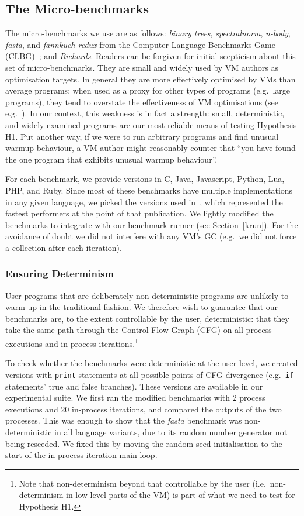 \documentclass[preprint,numbers,10pt]{sigplanconf}
\newcommand{\binarytrees}{\emph{binary trees}\xspace}
\newcommand{\richards}{\emph{Richards}\xspace}
\newcommand{\spectralnorm}{\emph{spectralnorm}\xspace}
\newcommand{\nbody}{\emph{n-body}\xspace}
\newcommand{\fasta}{\emph{fasta}\xspace}
\newcommand{\fannkuch}{\emph{fannkuch redux}\xspace}
\begin{document}
\subsection{The Micro-benchmarks}

The micro-benchmarks we use are as follows: \binarytrees, \spectralnorm, \nbody,
\fasta, and \fannkuch from the Computer Language Benchmarks Game (CLBG)~\cite{clbg}; and
\richards. Readers can be forgiven for initial scepticism about this set of micro-benchmarks.
They are small and widely
used by VM authors as optimisation targets. In general they are more effectively
optimised by VMs than average programs; when used as a proxy for other types
of programs (e.g.~large programs), they tend to overstate the effectiveness of
VM optimisations (see e.g.~\cite{ratanaworabhan09jsmeter}). In our context, this weakness is in fact a strength:
small, deterministic, and widely examined programs are our most
reliable means of testing Hypothesis H1. Put another way, if we were to run arbitrary programs
and find unusual warmup behaviour, a VM author might reasonably counter that
``you have found the one program that exhibits unusual warmup behaviour''.

For each benchmark, we provide versions in C, Java, Javascript, Python, Lua, PHP,
and Ruby. Since most of these
benchmarks have multiple implementations in any given language, we picked
the versions used in~\cite{bolz14impact}, which represented the fastest
performers at the point of that publication. We lightly modified
the benchmarks to integrate with our benchmark runner (see Section~\ref{krun}).
For the avoidance of doubt we did not interfere with any VM's GC (e.g.~we did not
force a collection after each iteration).


\subsubsection{Ensuring Determinism}

User programs that are deliberately non-deterministic programs are unlikely to
warm-up in the traditional fashion.
We therefore wish to guarantee that our benchmarks are,
to the extent controllable by the user, deterministic: that they
take the same path through the Control Flow Graph (CFG)
on all process executions and in-process iterations.\footnote{Note that non-determinism
beyond that controllable by the user (i.e.~non-determinism in low-level parts of
the VM) is part of what we need to test for Hypothesis H1.}

To check whether the benchmarks were deterministic at the user-level, we created
versions with \texttt{print} statements at all possible points of CFG
divergence (e.g.~\texttt{if} statements' true and false branches).
These versions are available in our experimental suite. We first ran the modified
benchmarks with 2 process executions and 20 in-process iterations,
and compared the outputs of the two processes. This was enough to show that the
\fasta benchmark was non-deterministic
in all language variants, due to its random number generator not being reseeded. We
fixed this by moving the random seed initialisation to the start
of the in-process iteration main loop.
\end{document}
